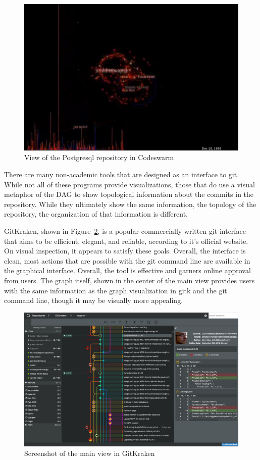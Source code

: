 \begin{figure}[htpb]
  \centering
  \includegraphics[width=0.8\linewidth]{Figures/introduction/codeswarm.png}
  \caption{View of the Postgresql repository in Codeswarm}
  \label{fig:codeswarm}
\end{figure}

There are many non-academic tools that are designed as an interface to
git. While not all of these programs provide visualizations, those that
do use a visual metaphor of the DAG to show topological information
about the commits in the repository. While they ultimately show the same
information, the topology of the repository, the organization of that
information is different.

GitKraken, shown in Figure~\ref{fig:gitkraken_main},  is a popular
commercially written git interface that aims to be efficient, elegant,
and reliable, according to it's official website. On visual inspection,
it appears to satisfy these goals. Overall, the interface is clean, most
actions that are possible with the git command line are available in the
graphical interface. Overall, the tool is effective and garners online
approval from users. The graph itself, shown in the center of the main
view provides users with the same information as the graph visualization
in gitk and the git command line, though it may be visually more
appealing.

\begin{figure}[htpb]
  \centering
  \includegraphics[width=0.8\linewidth]{Figures/introduction/gitkraken_main.png}
  \caption{Screenshot of the main view in GitKraken}
  \label{fig:gitkraken_main}
\end{figure}

